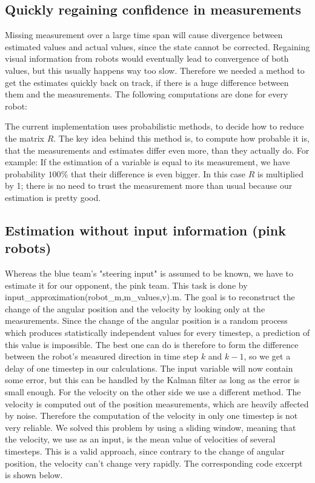 \subsection{Quickly regaining confidence in measurements}
Missing measurement  over a large time span will cause divergence between estimated values and actual values, since the state cannot be corrected. Regaining visual information from robots would eventually lead to convergence of both values, but this usually happens way too slow. Therefore we needed a method to get the estimates quickly back on track, if there is a huge difference between them and the measurements. The following computations are done for every robot:



The current implementation uses probabilistic methods, to decide how to reduce the matrix \(R\). The key idea behind this method is, to compute how probable it is, that the measurements and estimates differ even more, than they actually do. For example: If the estimation of a variable is equal to its measurement, we have probability \(100\%\) that their difference is even bigger. In this case \(R\) is multiplied by 1; there is no need to trust the measurement more than usual because our estimation is pretty good.

\subsection{Estimation without input information (pink robots)}
Whereas the blue team's "steering input" is assumed to be known, we have to estimate it for our opponent, the pink team. This task is done by {\selectfont input\_approximation(robot\_m,m\_values,v).m}. The goal is to reconstruct the change of the angular position and the velocity by looking only at the measurements. Since the change of the angular position is a random process which produces statistically independent values for every timestep, a prediction of this value is impossible. The best one can do is therefore to form the difference between the robot's measured direction in time step \(k\) and \(k-1\), so we get a delay of one timestep in our calculations. The input variable will now contain some error, but this can be handled by the Kalman filter as long as the error is small enough. For the velocity on the other side we use a different method. The velocity is computed out of the position measurements, which are heavily affected by noise. Therefore the computation of the velocity in only one timestep is not very reliable. We solved this problem by using a sliding window, meaning that the velocity, we use as an input, is the mean value of velocities of several timesteps. This is a valid approach, since contrary to the change of angular position, the velocity can't change very rapidly. The corresponding code excerpt is shown below.

